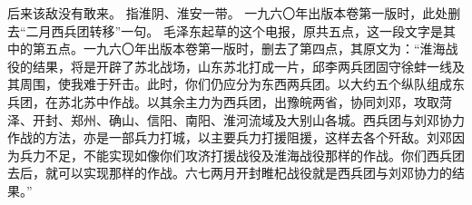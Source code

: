 \begin{maonote}
后来该敌没有敢来。
指淮阴、淮安一带。
一九六〇年出版本卷第一版时，此处删去“二月西兵团转移”一句。
毛泽东起草的这个电报，原共五点，这一段文字是其中的第五点。一九六〇年出版本卷第一版时，删去了第四点，其原文为：“淮海战役的结果，将是开辟了苏北战场，山东苏北打成一片，邱李两兵团固守徐蚌一线及其周围，使我难于歼击。此时，你们仍应分为东西两兵团。以大约五个纵队组成东兵团，在苏北苏中作战。以其余主力为西兵团，出豫皖两省，协同刘邓，攻取菏泽、开封、郑州、确山、信阳、南阳、淮河流域及大别山各城。西兵团与刘邓协力作战的方法，亦是一部兵力打城，以主要兵力打援阻援，这样去各个歼敌。刘邓因为兵力不足，不能实现如像你们攻济打援战役及淮海战役那样的作战。你们西兵团去后，就可以实现那样的作战。六七两月开封睢杞战役就是西兵团与刘邓协力的结果。”
\end{maonote}
